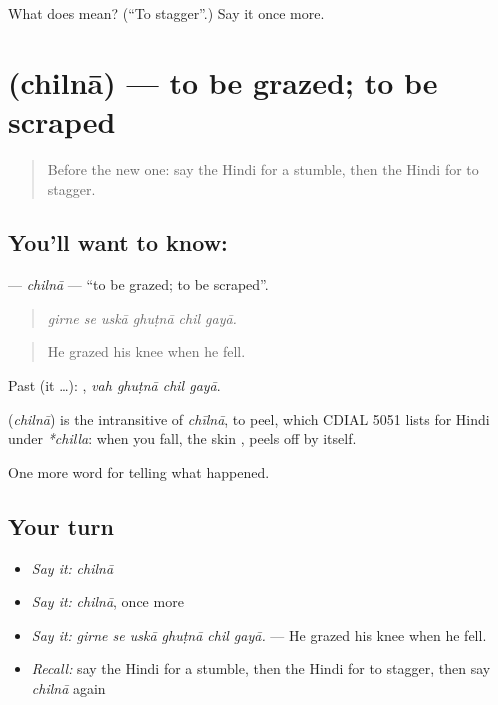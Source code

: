 \begin{tcolorbox}[breakable,colback=teal!4,colframe=teal!35!black,title={Before you move on}]
What does  mean? (\textquotedblleft{}To stagger\textquotedblright{}.) Say it once more.
\end{tcolorbox}
\section[\texorpdfstring{\hi{छिलना} (chilnā)}{छिलना (chilnā)}]{ (chilnā) — to be grazed; to be scraped}

\label{lesson:HI-C297-chilna}



\begin{quote}
Before the new one: say the Hindi for a stumble, then the Hindi for to stagger.
\end{quote}

\subsection*{You'll want to know: }
\textbf{} — \emph{chilnā} — \textquotedblleft{}to be grazed; to be scraped\textquotedblright{}.

\begin{quote}
     
\end{quote}

\begin{quote}
\emph{girne se uskā ghuṭnā chil gayā.}
\end{quote}

\begin{quote}
He grazed his knee when he fell.
\end{quote}

Past (it …):    , \emph{vah ghuṭnā chil gayā}.

\begin{cousinweb}
\textbf{} (\emph{chilnā}) is the intransitive of \emph{chīlnā}, to peel, which CDIAL 5051 lists for Hindi under \emph{*chilla}: when you fall, the skin \textbf{  }, peels off by itself.
\end{cousinweb}

\begin{grammarlens}[title={What you've built}]
One more word for telling what happened.
\end{grammarlens}

\subsection*{Your turn}
\begin{itemize}
\raggedright
  \item \emph{Say it:} \emph{chilnā}
  \item \emph{Say it:} \emph{chilnā}, once more
  \item \emph{Say it:} \emph{girne se uskā ghuṭnā chil gayā.} — He grazed his knee when he fell.
  \item \emph{Recall:} say the Hindi for a stumble, then the Hindi for to stagger, then say \emph{chilnā} again
\end{itemize}

